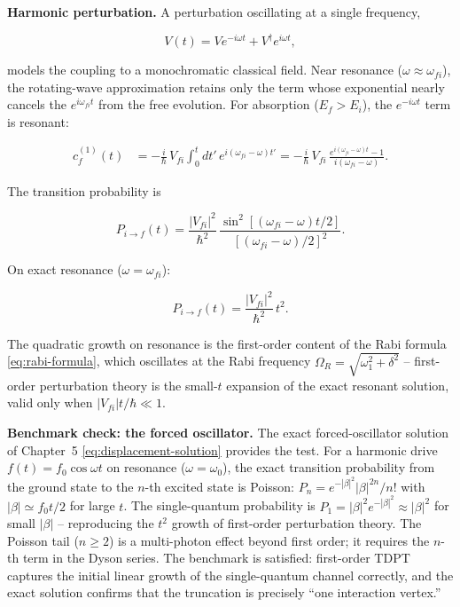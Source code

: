 \medskip\noindent\textbf{Harmonic perturbation.}
A perturbation oscillating at a single frequency,
\begin{linenomath}
\begin{equation*}
V(t) = V e^{-i\omega t} + V^{\dagger} e^{i\omega t},
\end{equation*}
\end{linenomath}
models the coupling to a monochromatic classical field. Near resonance ($\omega \approx \omega_{fi}$), the rotating-wave approximation retains only the term whose exponential nearly cancels the $e^{i\omega_{fi}t}$ from the free evolution. For absorption ($E_{f} > E_{i}$), the $e^{-i\omega t}$ term is resonant:
\begin{linenomath}
\begin{align}
c_{f}^{(1)}(t) &= -\frac{i}{\hbar}\,V_{fi}\int_{0}^{t} dt'\,e^{i(\omega_{fi}-\omega)t'}
= -\frac{i}{\hbar}\,V_{fi}\,\frac{e^{i(\omega_{fi}-\omega)t}-1}{i(\omega_{fi}-\omega)}.
\label{eq:harmonic-perturbation-amplitude}
\end{align}
\end{linenomath}
The transition probability is
\begin{linenomath}
\begin{equation*}
P_{i\to f}(t) = \frac{|V_{fi}|^{2}}{\hbar^{2}}\,
\frac{\sin^{2}[(\omega_{fi}-\omega)t/2]}{[(\omega_{fi}-\omega)/2]^{2}}.
\end{equation*}
\end{linenomath}
On exact resonance ($\omega = \omega_{fi}$):
\begin{linenomath}
\begin{equation*}
P_{i\to f}(t) = \frac{|V_{fi}|^{2}}{\hbar^{2}}\,t^{2}.
\end{equation*}
\end{linenomath}
The quadratic growth on resonance is the first-order content of the Rabi formula \eqref{eq:rabi-formula}, which oscillates at the Rabi frequency $\Omega_{R} = \sqrt{\omega_{1}^{2}+\delta^{2}}$ -- first-order perturbation theory is the small-$t$ expansion of the exact resonant solution, valid only when $|V_{fi}|t/\hbar \ll 1$.

\medskip\noindent\textbf{Benchmark check: the forced oscillator.}
The exact forced-oscillator solution of Chapter~5 \eqref{eq:displacement-solution} provides the test. For a harmonic drive $f(t) = f_{0}\cos\omega t$ on resonance ($\omega = \omega_{0}$), the exact transition probability from the ground state to the $n$-th excited state is Poisson: $P_{n} = e^{-|\beta|^{2}}|\beta|^{2n}/n!$ with $|\beta| \simeq f_{0}t/2$ for large $t$. The single-quantum probability is $P_{1} = |\beta|^{2}e^{-|\beta|^{2}} \approx |\beta|^{2}$ for small $|\beta|$ -- reproducing the $t^{2}$ growth of first-order perturbation theory. The Poisson tail ($n \ge 2$) is a multi-photon effect beyond first order; it requires the $n$-th term in the Dyson series. The benchmark is satisfied: first-order TDPT captures the initial linear growth of the single-quantum channel correctly, and the exact solution confirms that the truncation is precisely ``one interaction vertex.''

